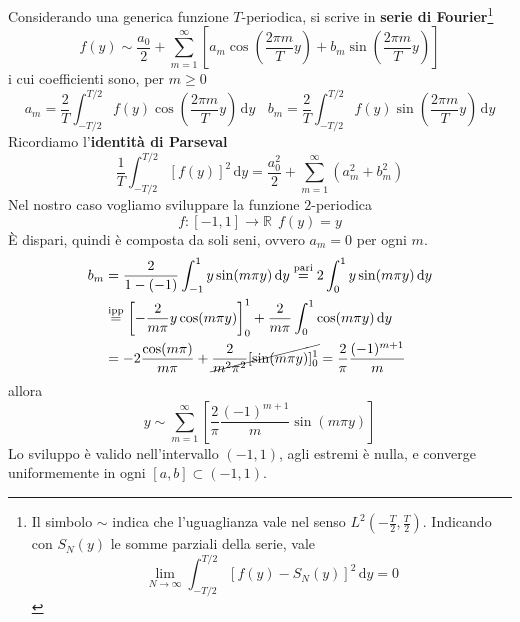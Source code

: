 \documentclass[10pt,a4paper,twoside,openright]{book}
\newcommand{\de}{\,\mathrm d}
\newcommand{\dy}{\de y}
\begin{document}
Considerando una generica funzione $T$-periodica, si scrive in \textbf{serie di Fourier}\footnote{Il simbolo $\sim $ indica che l'uguaglianza vale nel senso $L^{2}\left(-\frac{T}{2},\frac{T}{2}\right)$. Indicando con $S_{N}(y)$ le somme parziali della serie, vale
\begin{equation*}
\lim _{N\rightarrow \infty }\int ^{T/2}_{-T/2}[ f(y) -S_{N}(y)]^{2} \dy=0
\end{equation*}}
\begin{equation*}
f(y) \sim \frac{a_{0}}{2} +\sum\limits ^{\infty }_{m=1}\left[ a_{m}\cos\left(\frac{2\pi m}{T} y\right) +b_{m}\sin\left(\frac{2\pi m}{T} y\right)\right]
\end{equation*}
i cui coefficienti sono, per $m\geqslant 0$
\begin{equation*}
a_{m} =\frac{2}{T}\int ^{T/2}_{-T/2} f(y)\cos\left(\frac{2\pi m}{T} y\right) \dy\ \ \ \ b_{m} =\frac{2}{T}\int ^{T/2}_{-T/2} f(y)\sin\left(\frac{2\pi m}{T} y\right) \dy
\end{equation*}
Ricordiamo l'\textbf{identità di Parseval}
\begin{equation*}
\frac{1}{T}\int ^{T/2}_{-T/2}[ f(y)]^{2} \dy=\frac{a^{2}_{0}}{2} +\sum\limits ^{\infty }_{m=1}\left(a^{2}_{m} +b^{2}_{m}\right)
\end{equation*}
Nel nostro caso vogliamo sviluppare la funzione $2$-periodica
\begin{equation*}
f:[ -1,1]\rightarrow \mathbb{R} \ \ f(y) =y
\end{equation*}
È dispari, quindi è composta da soli seni, ovvero $a_{m}=0$ per ogni $m$.
\begin{align*}
b_{m} & = \frac{2}{1-(-1)}\int ^{1}_{-1} y\sin(m\pi y) \dy \overset{\text{pari}}{=}2\int ^{1}_{0} y\sin(m\pi y) \dy\\
 & \overset{\text{ipp}}{=}\left[ -\frac{2}{m\pi } y\cos(m\pi y)\right]^{1}_{0} +\frac{2}{m\pi }\int ^{1}_{0}\cos(m\pi y) \dy\\
 & =-2\frac{\cos(m\pi)}{m\pi } +\cancel{\frac{2}{m^{2} \pi ^{2}}[\sin(m\pi y)]^{1}_{0}} =\frac{2}{\pi }\frac{(-1)^{m+1}}{m}
\end{align*}
allora
\begin{equation}
y\sim \sum\limits ^{\infty }_{m=1}\left[\frac{2}{\pi }\frac{(-1)^{m+1}}{m}\sin(m\pi y)\right]
\label{eq:diff-y-fourier}
\end{equation}
Lo sviluppo è valido nell'intervallo $(-1,1)$, agli estremi è nulla, e converge uniformemente in ogni $[ a,b] \subset (-1,1)$.
\end{document}
